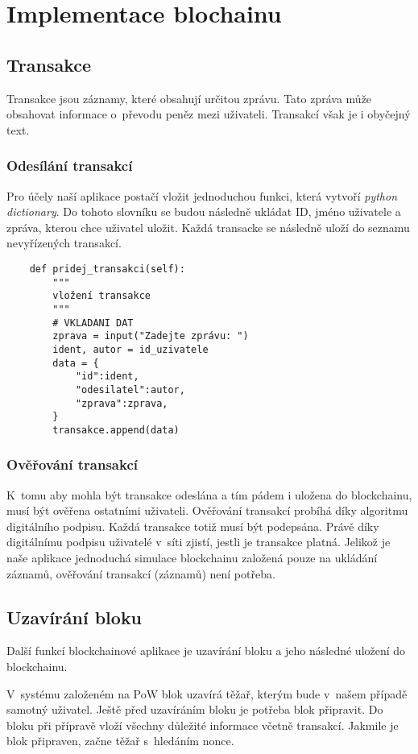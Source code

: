 \documentclass[12pt]{report}			%
\begin{document}
{	\chapter{Implementace blochainu}
	\section{Transakce}{
	Transakce jsou záznamy, které obsahují určitou zprávu. Tato zpráva může obsahovat informace o~převodu peněz mezi uživateli. Transakcí však je i obyčejný text. 
	}
	\subsection{Odesílání transakcí}{
	Pro účely naší aplikace postačí vložit jednoduchou funkci, která vytvoří \textit{python dictionary}. Do tohoto slovníku se budou následně ukládat ID, jméno uživatele a zpráva, kterou chce uživatel uložit. Každá transacke se následně uloží do seznamu nevyřízených transakcí.
	}
\begin{lstlisting} 
	def pridej_transakci(self):
        """
        vložení transakce
        """
        # VKLADANI DAT
        zprava = input("Zadejte zprávu: ")
        ident, autor = id_uzivatele 
        data = {
            "id":ident,
            "odesilatel":autor,
            "zprava":zprava,
        }
        transakce.append(data) 
\end{lstlisting}
	\subsection{Ověřování transakcí}{
K~tomu aby mohla být transakce odeslána a tím pádem i uložena do blockchainu, musí být ověřena ostatními uživateli. Ověřování transakcí probíhá díky algoritmu digitálního podpisu. Každá transakce totiž musí být podepsána. Právě díky digitálnímu podpisu uživatelé v~síti zjistí, jestli je transakce platná. Jelikož je naše aplikace jednoduchá simulace blockchainu založená pouze na ukládání záznamů, ověřování transakcí (záznamů) není potřeba. 
	}
	\section{Uzavírání bloku}{
Další funkcí blockchainové aplikace je uzavírání bloku a jeho následné uložení do blockchainu.

V~systému založeném na PoW blok uzavírá těžař, kterým bude v~našem případě samotný uživatel. Ještě před uzavíráním bloku je potřeba blok připravit. Do bloku při přípravě vloží všechny důležité informace včetně transakcí. Jakmile je blok připraven, začne těžař s~hledáním nonce.

}}
\end{document}
